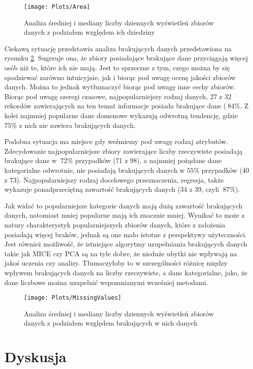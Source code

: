 \begin{figure}[ht]
  \texttt{[image: Plots/Area]}
  \caption{Analiza średniej i mediany liczby dziennych wyświetleń zbiorów danych z podziałem względem ich dziedziny}
  \label{fig:area}
\end{figure}

Ciekawą sytuację przedstawia analiza brakujących danych przedstawiona na rysunku \ref{fig:missingvalues}.
Sugeruje ona, że zbiory posiadające brakujące dane przyciągają więcej osób niż te, które ich nie mają.
Jest to sprzeczne z tym, czego można by się spodziewać zarówno intuicyjnie, jak i biorąc pod uwagę ocenę jakości zbiorów danych.
Można to jednak wytłumaczyć biorąc pod uwagę inne cechy zbiorów.
Biorąc pod uwagę szeregi czasowe, najpopularniejszy rodzaj danych, 27 z 32 rekordów zawierających na ten temat informacje posiada brakujące dane (\(~84\%\).
Z kolei najmniej popularne dane domenowe wykazują odwrotną tendencję, gdzie \(75\%\) z nich nie zawiera brakujących danych.

Podobna sytuacja ma miejsce gdy weźmiemy pod uwagę rodzaj atrybutów.
Zdecydowanie najpopularniejsze zbiory zawierające liczby rzeczywiste posiadają brakujące dane w \(~72\%\) przypadków (71 z 98), a najmniej pożądane dane kategorialne odwrotnie, nie posiadają brakujących danych w \(55\%\) przypadków (40 z 73).
Najpopularniejszy rodzaj docelowego przeznaczenia, regresja, także wykazuje ponadprzeciętną zawartość brakujących danych (34 z 39, czyli \(~87\%\)).

Jak widać to popularniejsze kategorie danych mają dużą zawartość brakujących danych, natomiast mniej popularne mają ich znacznie mniej.
Wynikać to może z natury charakterystyk popularniejszych zbiorów danych, które z założenia posiadają więcej braków, jednak są one mało istotne z perspektywy użyteczności.
Jest również możliwość, że istniejące algorytmy uzupełniania brakujących danych takie jak MICE czy PCA są na tyle dobre, że nieduże ubytki nie wpływają na jakoś uczenia czy analizy.
Tłumaczyłoby to w szczególności różnicę między wpływem brakujących danych na liczby rzeczywiste, a dane kategorialne, jako, że dane liczbowe można uzupełnić wspomnianymi wcześniej metodami.

\begin{figure}[ht]
  \texttt{[image: Plots/MissingValues]}
  \caption{Analiza średniej i mediany liczby dziennych wyświetleń zbiorów danych z podziałem względem brakujących w nich danych}
  \label{fig:missingvalues}
\end{figure}

\section{Dyskusja}
